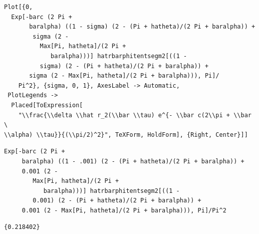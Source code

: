 \documentclass[reqno]{amsart}
\theoremstyle{definition} \newtheorem{definition}{Definition}[section]
\theoremstyle{definition} \newtheorem{remark}[definition]{Remark}
\theoremstyle{plain} \newtheorem{lemma}[definition]{Lemma}
\theoremstyle{plain} \newtheorem{proposition}[definition]{Proposition}
\theoremstyle{plain} \newtheorem{theorem}[definition]{Theorem}
\theoremstyle{plain} \newtheorem{corollary}[definition]{Corollary}
\theoremstyle{definition} \newtheorem{example}[definition]{Example}
\theoremstyle{plain} \newtheorem{claim}[clai]{Claim}
\theoremstyle{definition} \newtheorem{assumption}[definition]{Assumption}
\theoremstyle{definition} \newtheorem{observation}[definition]{Observation}
\newcommand{\1}{\mathbbm 1}
\newcommand{\sbig}{\bigskip}
\numberwithin{equation}{section} %
\theoremstyle{plain} \newtheorem*{theorem*}{Theorem}
\theoremstyle{plain} \newtheorem{mthm}[maintheorem]{Main Theorem}
\theoremstyle{plain} \newtheorem*{mthm*}{Main Theorem}
\theoremstyle{plain} \newtheorem*{conjecture*}{Conjecture}
\theoremstyle{plain} \newtheorem{conjecture}[definition]{Conjecture}
\theoremstyle{plain} \newtheorem*{problem*}{Problem}
\begin{document}
\begin{verbatim}
Plot[{0, 
  Exp[-barc (2 Pi + 
       baralpha) ((1 - sigma) (2 - (Pi + hatheta)/(2 Pi + baralpha)) +
        sigma (2 - 
          Max[Pi, hatheta]/(2 Pi + 
             baralpha)))] hatrbarphitentsegm2[((1 - 
          sigma) (2 - (Pi + hatheta)/(2 Pi + baralpha)) + 
       sigma (2 - Max[Pi, hatheta]/(2 Pi + baralpha))), Pi]/
    Pi^2}, {sigma, 0, 1}, AxesLabel -> Automatic, 
 PlotLegends -> 
  Placed[ToExpression[
    "\\frac{\\delta \\hat r_2(\\bar \\tau) e^{- \\bar c(2\\pi + \\bar \
\\alpha) \\tau}}{(\\pi/2)^2}", TeXForm, HoldForm], {Right, Center}]]
\end{verbatim}
\begin{verbatim}
Exp[-barc (2 Pi + 
     baralpha) ((1 - .001) (2 - (Pi + hatheta)/(2 Pi + baralpha)) + 
     0.001 (2 - 
        Max[Pi, hatheta]/(2 Pi + 
           baralpha)))] hatrbarphitentsegm2[((1 - 
        0.001) (2 - (Pi + hatheta)/(2 Pi + baralpha)) + 
     0.001 (2 - Max[Pi, hatheta]/(2 Pi + baralpha))), Pi]/Pi^2
\end{verbatim}
\begin{verbatim}
{0.218402}
\end{verbatim}

\sbig


\sbig
\end{document}
